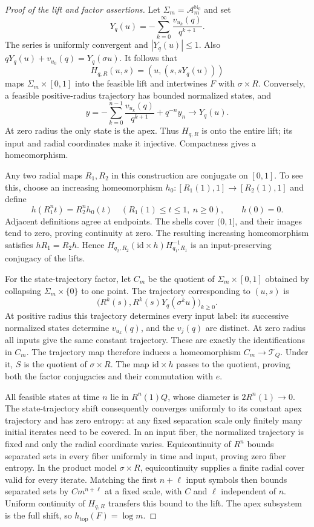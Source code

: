 \documentclass[11pt,a4paper]{article}
\theoremstyle{remark}
\newcommand{\A}{\mathcal A}
\newcommand{\T}{\mathcal T}
\newcommand{\h}{h_{\mathrm{top}}}
\begin{document}
\begin{proof}[Proof of the lift and factor assertions]
Let $\Sigma_m=\A_m^{\mathbb N_0}$ and set
\[
 Y_q(u)=-\sum_{k=0}^{\infty}\frac{v_{u_k}(q)}{q^{k+1}}.
\]
The series is uniformly convergent and $|Y_q(u)|\leq1$.
Also $qY_q(u)+v_{u_0}(q)=Y_q(\sigma u)$.
It follows that
\[
 H_{q,R}(u,s)=(u,(s,sY_q(u)))
\]
maps $\Sigma_m\times[0,1]$ into the feasible lift and intertwines $F$ with
$\sigma\times R$. Conversely, a feasible positive-radius trajectory has
bounded normalized states, and
\[
 y=-\sum_{k=0}^{n-1}\frac{v_{u_k}(q)}{q^{k+1}}+q^{-n}y_n
       \longrightarrow Y_q(u).
\]
At zero radius the only state is the apex. Thus $H_{q,R}$ is onto the
entire lift; its input and radial coordinates make it injective.
Compactness gives a homeomorphism.

Any two radial maps $R_1,R_2$ in this construction are conjugate on
$[0,1]$. To see this, choose an increasing homeomorphism
$h_0:[R_1(1),1]\to[R_2(1),1]$ and define
\[
 h(R_1^nt)=R_2^nh_0(t)\quad
   (R_1(1)\leq t\leq1,\ n\geq0),\qquad h(0)=0.
\]
Adjacent definitions agree at endpoints. The shells cover $(0,1]$, and
their images tend to zero, proving continuity at zero.
The resulting increasing homeomorphism satisfies $hR_1=R_2h$.
Hence
$H_{q_2,R_2}(\mathrm{id}\times h)H_{q_1,R_1}^{-1}$ is an input-preserving
conjugacy of the lifts.

For the state-trajectory factor, let $C_m$ be the quotient of
$\Sigma_m\times[0,1]$ obtained by collapsing $\Sigma_m\times\{0\}$ to one
point. The trajectory corresponding to $(u,s)$ is
\[
 \bigl(R^k(s),R^k(s)Y_q(\sigma^ku)\bigr)_{k\geq0}.
\]
At positive radius this trajectory determines every input label: its
successive normalized states determine $v_{u_k}(q)$, and the $v_j(q)$ are
distinct. At zero radius all inputs give the same constant trajectory.
These are exactly the identifications in $C_m$.
The trajectory map therefore induces a homeomorphism $C_m\to\T_Q$.
Under it, $S$ is the quotient of $\sigma\times R$.
The map $\mathrm{id}\times h$ passes to the quotient, proving both the
factor conjugacies and their commutation with $e$.

All feasible states at time $n$ lie in $R^n(1)Q$, whose diameter is
$2R^n(1)\to0$. The state-trajectory shift consequently converges
uniformly to its constant apex trajectory and has zero entropy: at any
fixed separation scale only finitely many initial iterates need to be
covered. In an input fiber, the normalized trajectory is fixed and only
the radial coordinate varies. Equicontinuity of $R^n$ bounds separated
sets in every fiber uniformly in time and input, proving zero fiber
entropy.
In the product model $\sigma\times R$, equicontinuity supplies a finite
radial cover valid for every iterate. Matching the first $n+\ell$ input
symbols then bounds separated sets by $Cm^{n+\ell}$ at a fixed scale,
with $C$ and $\ell$ independent of $n$. Uniform continuity of $H_{q,R}$
transfers this bound to the lift. The apex subsystem is the full shift,
so $\h(F)=\log m$.


\end{proof}
\end{document}
